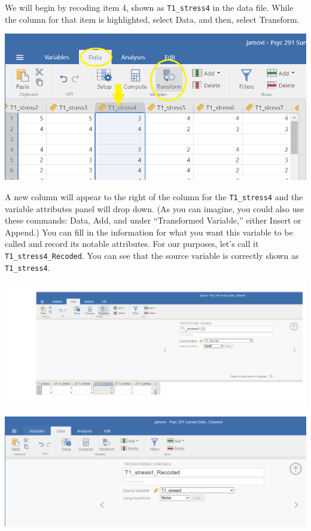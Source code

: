 \documentclass[
]{book}
\begin{document}
We will begin by recoding item 4, shown as \texttt{T1\_stress4} in the data file. While the column for that item is highlighted, select {Data}, and then, select {Transform}.

\includegraphics{img/StressScale_CommandsToRecode.png}

A new column will appear to the right of the column for the \texttt{T1\_stress4} and the variable attributes panel will drop down. (As you can imagine, you could also use these commands: {Data}, {Add}, and under ``Transformed Variable,'' either {Insert} or {Append}.) You can fill in the information for what you want this variable to be called and record its notable attributes. For our purposes, let's call it \texttt{T1\_stress4\_Recoded}. You can see that the source variable is correctly shown as \texttt{T1\_stress4}.

\includegraphics{img/StressScale_CommandsToRecodeT1Stress4.png}

\includegraphics{img/StressScale_RenamingT1Stress4RecodedVariable.png}
\end{document}
